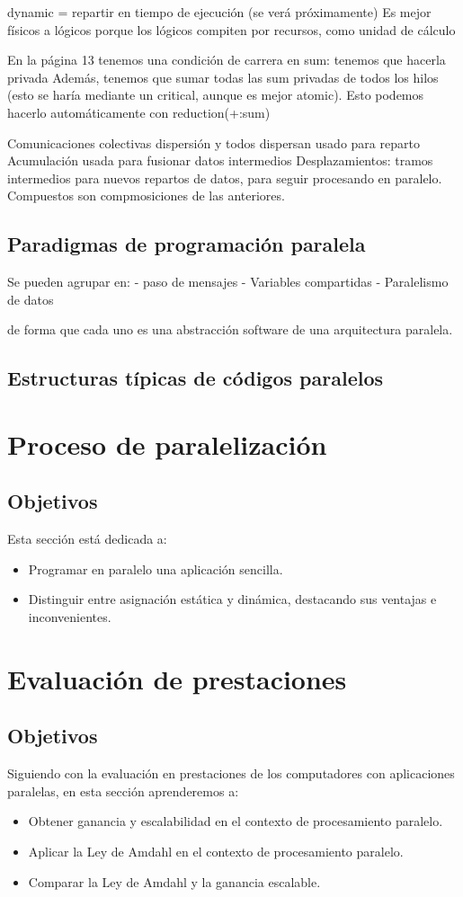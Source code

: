 dynamic = repartir en tiempo de ejecución (se verá próximamente)
Es mejor físicos a lógicos porque los lógicos compiten por recursos, como unidad de cálculo

En la página 13 tenemos una condición de carrera en sum: tenemos que hacerla privada
Además, tenemos que sumar todas las sum privadas de todos los hilos (esto se haría mediante un critical, aunque es mejor atomic).
Esto podemos hacerlo automáticamente con reduction(+:sum)

Comunicaciones colectivas
dispersión y todos dispersan usado para reparto
Acumulación usada para fusionar datos intermedios
Desplazamientos: tramos intermedios para nuevos repartos de datos, para seguir procesando en paralelo.
Compuestos son compmosiciones de las anteriores.

\subsection{Paradigmas de programación paralela}
Se pueden agrupar en:
- paso de mensajes
- Variables compartidas
- Paralelismo de datos

de forma que cada uno es una abstracción software de una arquitectura paralela.

\subsection{Estructuras típicas de códigos paralelos}
\section{Proceso de paralelización}
\subsection{Objetivos}
Esta sección está dedicada a:
\begin{itemize}
    \item Programar en paralelo una aplicación sencilla.
    \item Distinguir entre asignación estática y dinámica, destacando sus ventajas e inconvenientes.
\end{itemize}

\section{Evaluación de prestaciones}
\subsection{Objetivos}
Siguiendo con la evaluación en prestaciones de los computadores con aplicaciones paralelas, en esta sección aprenderemos a:
\begin{itemize}
    \item Obtener ganancia y escalabilidad en el contexto de procesamiento paralelo.
    \item Aplicar la Ley de Amdahl en el contexto de procesamiento paralelo.
    \item Comparar la Ley de Amdahl y la ganancia escalable.
\end{itemize}
